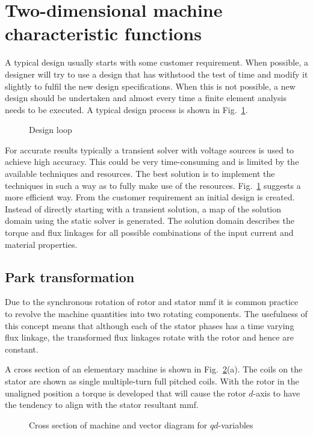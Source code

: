 \section{Two-dimensional machine characteristic functions}
A typical design usually starts with some customer requirement. When possible, a designer will try to use a design that has withstood the test of time and modify it slightly to fulfil the new design specifications. When this is not possible, a new design should be undertaken and almost every time a finite element analysis needs to be executed. A typical design process is shown in Fig.~\ref{fig:Main_design_loop}.
\begin{figure}
  \centering
  
  \vspace{0.2cm}
  
  \caption{Design loop}
  \label{fig:Main_design_loop}
\end{figure} 
For accurate results typically a transient solver with voltage sources is used to achieve high accuracy. This could be very time-consuming and is limited by the available techniques and resources. The best solution is to implement the techniques in such a way as to fully make use of the resources. Fig.~\ref{fig:Main_design_loop} suggests a more efficient way. From the customer requirement an initial design is created. Instead of directly starting with a transient solution, a map of the solution domain using the static solver is generated. The solution domain describes the torque and flux linkages for all possible combinations of the input current and material properties.

\subsection{Park transformation}
Due to the synchronous rotation of rotor and stator mmf it is common practice to revolve the machine quantities into two rotating components. The usefulness of this concept means that although each of the stator phases has a time varying flux linkage, the transformed flux linkages rotate with the rotor and hence are constant. 

A cross section of an elementary machine is shown in Fig.~\ref{fig:qd_transform}(a). The coils on the stator are shown as single multiple-turn full pitched coils. With the rotor in the unaligned position a torque is developed that will cause the rotor $d$-axis to have the tendency to align with the stator resultant mmf.     
\begin{figure}[htbp]
  \centering
    
    \caption{Cross section of machine and vector diagram for $qd$-variables}
    \label{fig:qd_transform}
\end{figure}


